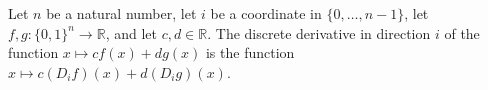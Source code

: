 \begin{lemma}
\leanok
{}
Let $n$ be a natural number, let $i$ be a coordinate in $\{0,\ldots,n-1\}$, let
$f,g:\{0,1\}^n\to\mathbb R$, and let $c,d\in\mathbb R$. The discrete derivative in
direction $i$ of the function $x\mapsto c f(x)+d g(x)$ is the function $x\mapsto c(D_i
f)(x)+d(D_i g)(x)$.
\end{lemma}

